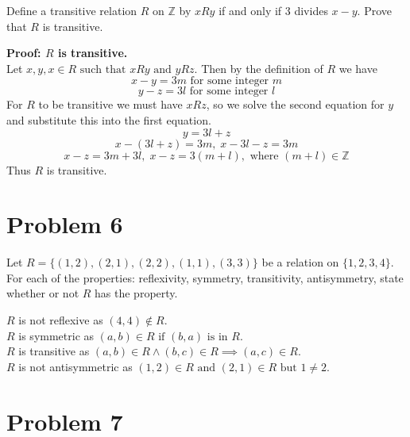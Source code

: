 \documentclass[12pt]{article}
\begin{document}
\begin{tcolorbox}[colback=gray!10, colframe=black, title=Given]
	Define a transitive relation $R$ on $\mathbb{Z}$ by $xRy$ if and only if 3 divides $x-y$.
	Prove that $R$ is transitive.
\end{tcolorbox}

\begin{tcolorbox}[colback=yellow!20, colframe=black, title=Solution]
	\textbf{Proof: $R$ is transitive.}
	\\Let $x,y,x\in R \text{ such that } xRy\text{ and }yRz$. Then by the definition of $R$
	we have
	\[x-y=3m \text{ for some integer $m$}\] \[y-z=3l \text{ for some integer $l$} \]
	For $R$ to be transitive we must have $xRz$, so we solve the second equation for $y$
	and substitute this into the first equation.
	\[y=3l+z\] \[x-(3l+z)=3m,\; x-3l-z=3m\] \[x-z=3m+3l,\; x-z=3(m+l), \text{ where $(m+l)\in \mathbb{Z}$}\]
	Thus $R$ is transitive.
\end{tcolorbox}
\section*{Problem 6}

\begin{tcolorbox}[colback=gray!10, colframe=black, title=Given]
	Let $R=\{(1,2),(2,1),(2,2),(1,1),(3,3)\}$ be a relation on $\{1,2,3,4\}$.
	For each of the properties: reflexivity, symmetry, transitivity, antisymmetry, state whether or not $R$ has the property.
\end{tcolorbox}

\begin{tcolorbox}[colback=yellow!20, colframe=black, title=Solution]
	$R$ is not reflexive as $(4,4)\notin R$.\\
	$R$ is symmetric as $(a,b)\in R \text{ if } (b,a) \text{ is in } R$.\\
	$R$ is transitive as $(a,b)\in R \land (b,c)\in R \implies (a,c)\in R$.\\
	$R$ is not antisymmetric as $(1,2)\in R \text{ and } (2,1)\in R \text{ but } 1\neq2$.
\end{tcolorbox}
\section*{Problem 7}
\end{document}
